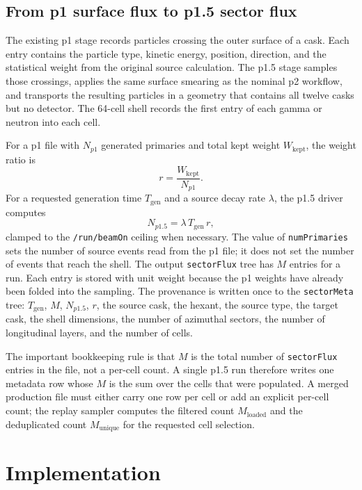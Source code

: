 \documentclass[11pt,a4paper]{article}
\begin{document}
\subsection{From p1 surface flux to p1.5 sector flux}

The existing p1 stage records particles crossing the outer surface of a cask.
Each entry contains the particle type, kinetic energy, position, direction, and
the statistical weight from the original source calculation. The p1.5 stage
samples those crossings, applies the same surface smearing as the nominal p2
workflow, and transports the resulting particles in a geometry that contains all
twelve casks but no detector. The 64-cell shell records the first entry of each
gamma or neutron into each cell.

For a p1 file with $N_{p1}$ generated primaries and total kept weight
$W_{\mathrm{kept}}$, the weight ratio is
\begin{equation}
  r=\frac{W_{\mathrm{kept}}}{N_{p1}}.
\end{equation}
For a requested generation time $T_{\mathrm{gen}}$ and a source decay rate
$\lambda$, the p1.5 driver computes
\begin{equation}
  N_{p1.5}=\lambda\,T_{\mathrm{gen}}\,r,
  \label{eq:nps}
\end{equation}
clamped to the \texttt{/run/beamOn} ceiling when necessary. The value of
\texttt{numPrimaries} sets the number of source events read from the p1 file; it
does not set the number of events that reach the shell. The output
\texttt{sectorFlux} tree has $M$ entries for a run. Each entry is stored with
unit weight because the p1 weights have already been folded into the sampling.
The provenance is written once to the \texttt{sectorMeta} tree:
$T_{\mathrm{gen}}$, $M$, $N_{p1.5}$, $r$, the source cask, the hexant, the
source type, the target cask, the shell dimensions, the number of azimuthal
sectors, the number of longitudinal layers, and the number of cells.

The important bookkeeping rule is that $M$ is the total number of
\texttt{sectorFlux} entries in the file, not a per-cell count. A single p1.5 run
therefore writes one metadata row whose $M$ is the sum over the cells that were
populated. A merged production file must either carry one row per cell or add an
explicit per-cell count; the replay sampler computes the filtered count
$M_{\mathrm{loaded}}$ and the deduplicated count $M_{\mathrm{unique}}$ for the
requested cell selection.

\section{Implementation}
\end{document}
